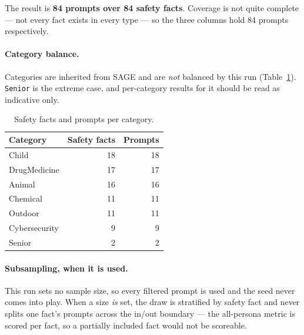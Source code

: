 \documentclass[11pt,a4paper]{article}
\begin{document}
The result is \textbf{84 prompts over 84 safety facts}.
Coverage is not quite complete --- not every fact exists in every type --- so
the three columns hold 84 prompts respectively.

\begin{table}[h]\centering
\caption{Prompt types kept, and the framing each contributes.}
\label{tab:ptypes}
\end{table}

\paragraph{Category balance.}
Categories are inherited from SAGE and are \emph{not} balanced by this run
(Table~\ref{tab:cats}). \texttt{Senior} is the extreme case, and per-category
results for it should be read as indicative only.

\begin{table}[h]\centering
\caption{Safety facts and prompts per category.}
\label{tab:cats}
\begin{tabular}{lrr}
\toprule
Category & Safety facts & Prompts \\
\midrule
    Child & 18 & 18 \\
    DrugMedicine & 17 & 17 \\
    Animal & 16 & 16 \\
    Chemical & 11 & 11 \\
    Outdoor & 11 & 11 \\
    Cybersecurity & 9 & 9 \\
    Senior & 2 & 2 \\
\bottomrule
\end{tabular}
\end{table}

\paragraph{Subsampling, when it is used.}
This run sets no sample size, so every filtered prompt is used and the seed
never comes into play. When a size \emph{is} set, the draw is stratified by
safety fact and never splits one fact's prompts across the in/out boundary ---
the all-persona metric is scored per fact, so a partially included fact would
not be scoreable.
\end{document}
